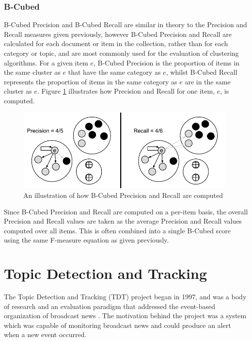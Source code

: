 \subsubsection{B-Cubed}
\label{background:bcubed}
B-Cubed Precision and B-Cubed Recall are similar in theory to the Precision and Recall measures given previously, however B-Cubed Precision and Recall are calculated for each document or item in the collection, rather than for each category or topic, and are most commonly used for the evaluation of clustering algorithms.
For a given item $e$, B-Cubed Precision is the proportion of items in the same cluster as $e$ that have the same category as $e$, whilst B-Cubed Recall represents the proportion of items in the same category as $e$ are in the same cluster as $e$.
Figure \ref{background:graphic:bcubed} illustrates how Precision and Recall for one item, $e$, is computed.

\vspace{0.5cm}
\begin{figure}[h!]
	\centering
	\includegraphics[width=11cm]{Chapters/Background/bcubed.pdf}
	\caption{An illustration of how B-Cubed Precision and Recall are computed}
	\label{background:graphic:bcubed}
\end{figure}

Since B-Cubed Precision and Recall are computed on a per-item basis, the overall Precision and Recall values are taken as the average Precision and Recall values computed over all items.
This is often combined into a single B-Cubed score using the same F-measure equation as given previously.

\section{Topic Detection and Tracking}
The Topic Detection and Tracking (TDT) project began in 1997, and was a body of research and an evaluation paradigm that addressed the event-based organization of broadcast news \citep{Allan:2002:ITD:772260.772262}.
The motivation behind the project was a system which was capable of monitoring broadcast news and could produce an alert when a new event occurred.


